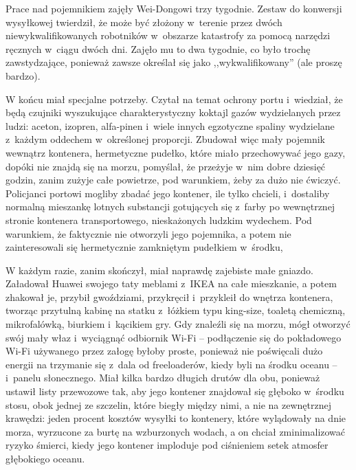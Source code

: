 \documentclass[oneside,polish,11pt,rmheadings]{mwbk}
\begin{document}
Prace nad pojemnikiem zajęły Wei-Dongowi trzy tygodnie. Zestaw do konwersji wysyłkowej twierdził, że może być złożony w~terenie przez dwóch niewykwalifikowanych robotników w~obszarze katastrofy za pomocą narzędzi ręcznych w~ciągu dwóch dni. Zajęło mu to dwa tygodnie, co było trochę zawstydzające, ponieważ zawsze określał się jako ,,wykwalifikowany'' (ale proszę bardzo).

W końcu miał specjalne potrzeby. Czytał na temat ochrony portu i~wiedział, że będą czujniki wyszukujące charakterystyczny koktajl gazów wydzielanych przez ludzi: aceton, izopren, alfa-pinen i~wiele innych egzotyczne spaliny wydzielane z~każdym oddechem w~określonej proporcji. Zbudował więc mały pojemnik wewnątrz kontenera, hermetyczne pudełko, które miało przechowywać jego gazy, dopóki nie znajdą się na morzu, pomyślał, że przeżyje w~nim dobre dziesięć godzin, zanim zużyje całe powietrze, pod warunkiem, żeby za dużo nie ćwiczyć. Policjanci portowi mogliby zbadać jego kontener, ile tylko chcieli, i~dostaliby normalną mieszankę lotnych substancji gotujących się z~farby po wewnętrznej stronie kontenera transportowego, nieskażonych ludzkim wydechem. Pod warunkiem, że faktycznie nie otworzyli jego pojemnika, a potem nie zainteresowali się hermetycznie zamkniętym pudełkiem w~środku,

W każdym razie, zanim skończył, miał naprawdę zajebiste małe gniazdo. Załadował Huawei swojego taty meblami z~IKEA na całe mieszkanie, a potem zhakował je, przybił gwoździami, przykręcił i~przykleił do wnętrza kontenera, tworząc przytulną kabinę na statku z~łóżkiem typu king-size, toaletą chemiczną, mikrofalówką, biurkiem i~kącikiem gry. Gdy znaleźli się na morzu, mógł otworzyć swój mały właz i~wyciągnąć odbiornik Wi-Fi -- podłączenie się do pokładowego Wi-Fi używanego przez załogę byłoby proste, ponieważ nie poświęcali dużo energii na trzymanie się z~dala od freeloaderów, kiedy byli na środku oceanu -- i~panelu słonecznego. Miał kilka bardzo długich drutów dla obu, ponieważ ustawił listy przewozowe tak, aby jego kontener znajdował się głęboko w~środku stosu, obok jednej ze szczelin, które biegły między nimi, a nie na zewnętrznej krawędzi: jeden procent kosztów wysyłki to kontenery, które wylądowały na dnie morza, wyrzucone za burtę na wzburzonych wodach, a on chciał zminimalizować ryzyko śmierci, kiedy jego kontener imploduje pod ciśnieniem setek atmosfer głębokiego oceanu.
\end{document}
